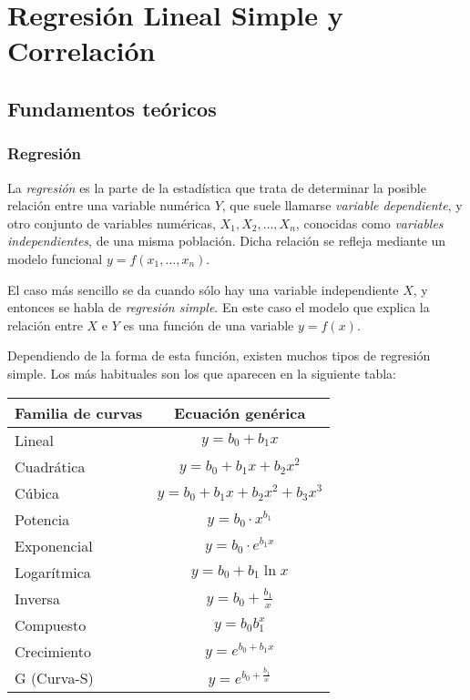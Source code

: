 
\chapter{Regresión Lineal Simple y Correlación}

\section{Fundamentos teóricos}
\subsection{Regresión}
La \emph{regresión} es la parte de la estadística que trata de determinar la
posible relación entre una variable numérica $Y$, que suele llamarse
\emph{variable dependiente}, y otro conjunto de variables numéricas, $X_1,
X_2,\ldots,X_n$, conocidas como \emph{variables independientes}, de una misma
población. Dicha relación se refleja mediante un modelo funcional
$y=f(x_1,\ldots,x_n)$.

El caso más sencillo se da cuando sólo hay una variable independiente $X$, y
entonces se habla de \emph{regresión simple}. En este caso el modelo que
explica la relación entre $X$ e $Y$ es una función de una variable $y=f(x)$.

Dependiendo de la forma de esta función, existen muchos tipos de regresión
simple. Los más habituales son los que aparecen en la siguiente tabla:
\begin{center}
\begin{tabular}{|l|c|}
\hline
 Familia de curvas       &     Ecuación genérica      \\
\hline\hline
 Lineal                  &          $y=b_0+b_1x$          \\
\hline
 Cuadrática              &       $y=b_0+b_1x+b_2x^2$        \\
\hline
 Cúbica & $y=b_0+b_1x+b_2x^2+b_3x^3$ \\
\hline
 Potencia               &       $y=b_0\cdot x^{b_1}$       \\
\hline
 Exponencial             &     $y=b_0\cdot e^{b_1x}$      \\
\hline
 Logarítmica             &       $y=b_0+b_1\ln x$        \\
\hline
Inversa             &       $y=b_0+\frac{b_1}{x}$        \\
\hline
Compuesto              &       $y=b_0b_1^x$        \\
\hline
Crecimiento             &       $y= e^{b_0 + b_1x}$        \\
\hline
G (Curva-S)             &       $y= e^{b_0 +\frac{b_1}{x} }$        \\
\hline
\end{tabular}
\end{center}

